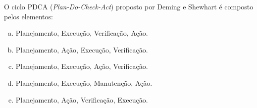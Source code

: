  O ciclo PDCA ({\em Plan-Do-Check-Act}) proposto por Deming e Shewhart é composto pelos elementos:

\begin{enumerate}[a)]
\item Planejamento, Execução, Verificação, Ação.
\item Planejamento, Ação, Execução, Verificação.
\item Planejamento, Execução, Ação, Verificação.
\item Planejamento, Execução, Manutenção, Ação.
\item Planejamento, Ação, Verificação, Execução.
\end{enumerate}
